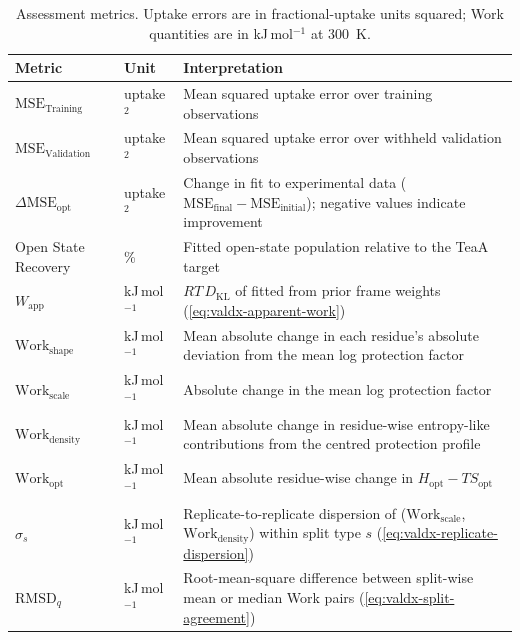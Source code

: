 \begin{table}[htbp]
    \centering
    \small
    \begin{tabularx}{\textwidth}{l l X}
        \toprule
        \textbf{Metric} & \textbf{Unit} & \textbf{Interpretation} \\
        \midrule
        $\text{MSE}_\text{Training}$ & uptake$^2$ & Mean squared uptake error over training observations \\
        $\text{MSE}_\text{Validation}$ & uptake$^2$ & Mean squared uptake error over withheld validation observations \\
        $\Delta\text{MSE}_\text{opt}$ & uptake$^2$ & Change in fit to experimental data ($\text{MSE}_\text{final}-\text{MSE}_\text{initial}$); negative values indicate improvement \\
        Open State Recovery & \% & Fitted open-state population relative to the TeaA target \\
        $W_\text{app}$ & kJ\,mol$^{-1}$ & $RT\,D_\text{KL}$ of fitted from prior frame weights (\cref{eq:valdx-apparent-work}) \\
        $\text{Work}_\text{shape}$ & kJ\,mol$^{-1}$ & Mean absolute change in each residue's absolute deviation from the mean log protection factor \\
        $\text{Work}_\text{scale}$ & kJ\,mol$^{-1}$ & Absolute change in the mean log protection factor \\
        $\text{Work}_\text{density}$ & kJ\,mol$^{-1}$ & Mean absolute change in residue-wise entropy-like contributions from the centred protection profile \\
        $\text{Work}_\text{opt}$ & kJ\,mol$^{-1}$ & Mean absolute residue-wise change in $H_\text{opt}-TS_\text{opt}$ \\
        $\sigma_s$ & kJ\,mol$^{-1}$ & Replicate-to-replicate dispersion of ($\text{Work}_\text{scale}$, $\text{Work}_\text{density}$) within split type $s$ (\cref{eq:valdx-replicate-dispersion}) \\
        $\mathrm{RMSD}_q$ & kJ\,mol$^{-1}$ & Root-mean-square difference between split-wise mean or median Work pairs (\cref{eq:valdx-split-agreement}) \\
        \bottomrule
    \end{tabularx}
    \caption{Assessment metrics. Uptake errors are in fractional-uptake units squared; Work quantities are in kJ\,mol$^{-1}$ at 300~K.}
    \label{tab:valdx-metrics}
\end{table}


